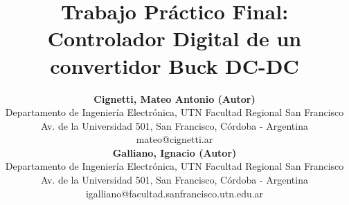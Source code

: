 \documentclass[12pt, a4paper, fleqn]{article}
\title{Trabajo Práctico Final: Controlador Digital de un convertidor Buck DC-DC}
\author{\textbf{Cignetti, Mateo Antonio (Autor)} \\ Departamento de Ingeniería Electrónica, UTN Facultad Regional San Francisco \\
        Av. de la Universidad 501, San Francisco, Córdoba - Argentina \\ mateo@cignetti.ar \\ \vspace{0.5cm}
        \textbf{Galliano, Ignacio (Autor)} \\ Departamento de Ingeniería Electrónica, UTN Facultad Regional San Francisco \\
        Av. de la Universidad 501, San Francisco, Córdoba - Argentina \\ igalliano@facultad.sanfrancisco.utn.edu.ar \\ \vspace{0.5cm}}
\date{}
\begin{document}
    \maketitle
    \thispagestyle{fancy}

    
    

    
    
    
    \newpage
    

    \newpage
    \renewcommand{\refname}{\large REFERENCIAS}
    \begin{minipage}{0.9\textwidth}
    \printbibliography
    \end{minipage}
\end{document}
